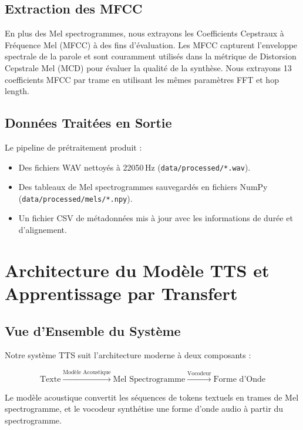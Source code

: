 \documentclass[12pt,a4paper]{article}
\begin{document}
\subsection{Extraction des MFCC}

En plus des Mel spectrogrammes, nous extrayons les Coefficients Cepstraux à Fréquence Mel (MFCC) à des fins d'évaluation. Les MFCC capturent l'enveloppe spectrale de la parole et sont couramment utilisés dans la métrique de Distorsion Cepstrale Mel (MCD) pour évaluer la qualité de la synthèse. Nous extrayons 13 coefficients MFCC par trame en utilisant les mêmes paramètres FFT et hop length.

\subsection{Données Traitées en Sortie}

Le pipeline de prétraitement produit :
\begin{itemize}
    \item Des fichiers WAV nettoyés à 22050\,Hz (\texttt{data/processed/*.wav}).
    \item Des tableaux de Mel spectrogrammes sauvegardés en fichiers NumPy (\texttt{data/processed/mels/*.npy}).
    \item Un fichier CSV de métadonnées mis à jour avec les informations de durée et d'alignement.
\end{itemize}

\section{Architecture du Modèle TTS et Apprentissage par Transfert}
\label{sec:architecture}

\subsection{Vue d'Ensemble du Système}

Notre système TTS suit l'architecture moderne à deux composants :

\begin{equation}
\text{Texte} \xrightarrow{\text{Modèle Acoustique}} \text{Mel Spectrogramme} \xrightarrow{\text{Vocodeur}} \text{Forme d'Onde}
\end{equation}

Le modèle acoustique convertit les séquences de tokens textuels en trames de Mel spectrogramme, et le vocodeur synthétise une forme d'onde audio à partir du spectrogramme.
\end{document}
